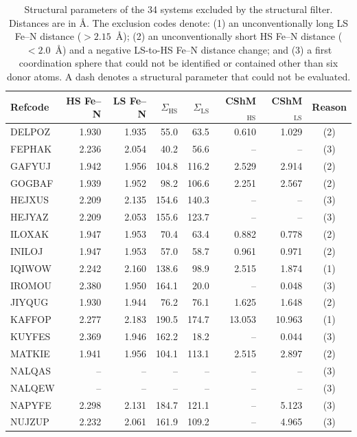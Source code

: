 \begin{table}[htbp]
\centering
\scriptsize
\setlength{\tabcolsep}{3.5pt}
\caption{Structural parameters of the 34 systems excluded by the structural filter. Distances are in \AA{}. The exclusion codes denote: (1) an unconventionally long LS Fe--N distance ($>2.15$~\AA{}); (2) an unconventionally short HS Fe--N distance ($<2.0$~\AA{}) and a negative LS-to-HS Fe--N distance change; and (3) a first coordination sphere that could not be identified or contained other than six donor atoms. A dash denotes a structural parameter that could not be evaluated.}
\label{SI-tab:structural-outliers}
\begin{tabular}{lrrrrrrc}
\hline
Refcode & HS Fe--N & LS Fe--N & $\Sigma_{\mathrm{HS}}$ & $\Sigma_{\mathrm{LS}}$ & CShM$_{\mathrm{HS}}$ & CShM$_{\mathrm{LS}}$ & Reason \\
\hline
DELPOZ & 1.930 & 1.935 & 55.0 & 63.5 & 0.610 & 1.029 & (2) \\
FEPHAK & 2.236 & 2.054 & 40.2 & 56.6 & -- & -- & (3) \\
GAFYUJ & 1.942 & 1.956 & 104.8 & 116.2 & 2.529 & 2.914 & (2) \\
GOGBAF & 1.939 & 1.952 & 98.2 & 106.6 & 2.251 & 2.567 & (2) \\
HEJXUS & 2.209 & 2.135 & 154.6 & 140.3 & -- & -- & (3) \\
HEJYAZ & 2.209 & 2.053 & 155.6 & 123.7 & -- & -- & (3) \\
ILOXAK & 1.947 & 1.953 & 70.4 & 63.4 & 0.882 & 0.778 & (2) \\
INILOJ & 1.947 & 1.953 & 57.0 & 58.7 & 0.961 & 0.971 & (2) \\
IQIWOW & 2.242 & 2.160 & 138.6 & 98.9 & 2.515 & 1.874 & (1) \\
IROMOU & 2.380 & 1.950 & 164.1 & 20.0 & -- & 0.048 & (3) \\
JIYQUG & 1.930 & 1.944 & 76.2 & 76.1 & 1.625 & 1.648 & (2) \\
KAFFOP & 2.277 & 2.183 & 190.5 & 174.7 & 13.053 & 10.963 & (1) \\
KUYFES & 2.369 & 1.946 & 162.2 & 18.2 & -- & 0.044 & (3) \\
MATKIE & 1.941 & 1.956 & 104.1 & 113.1 & 2.515 & 2.897 & (2) \\
NALQAS & -- & -- & -- & -- & -- & -- & (3) \\
NALQEW & -- & -- & -- & -- & -- & -- & (3) \\
NAPYFE & 2.298 & 2.131 & 184.7 & 121.1 & -- & 5.123 & (3) \\
NUJZUP & 2.232 & 2.061 & 161.9 & 109.2 & -- & 4.965 & (3) \\

\end{tabular}
\end{table}
